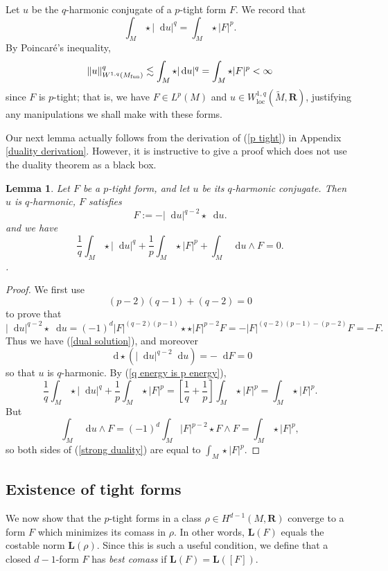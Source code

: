 \documentclass[reqno,11pt]{amsart}
\newcommand{\RR}{\mathbf{R}}
\newcommand*\dif{\mathop{}\!\mathrm{d}}
\newcommand{\Comass}{\mathbf L}
\newcommand{\dfn}[1]{\emph{#1}\index{#1}}
\newcommand{\loc}{\mathrm{loc}}
\newtheorem{lemma}[theorem]{Lemma}
\theoremstyle{definition}
\numberwithin{equation}{section}
\begin{document}
Let $u$ be the $q$-harmonic conjugate of a $p$-tight form $F$.
We record that 
\begin{equation}\label{q energy is p energy}
\int_M \star |\dif u|^q = \int_M \star |F|^p.
\end{equation}
By Poincar\'e's inequality,
$$\|u\|_{W^{1, q}(M_{\rm fun})}^q \lesssim \int_M \star |\dif u|^q = \int_M \star |F|^p < \infty$$
since $F$ is $p$-tight; that is, we have $F \in L^p(M)$ and $u \in W^{1, q}_\loc(\tilde M, \RR)$, justifying any manipulations we shall make with these forms.

Our next lemma actually follows from the derivation of (\ref{p tight}) in Appendix \ref{duality derivation}.
However, it is instructive to give a proof which does not use the duality theorem as a black box.

\begin{lemma}
Let $F$ be a $p$-tight form, and let $u$ be its $q$-harmonic conjugate.
Then $u$ is $q$-harmonic, $F$ satisfies
\begin{equation}\label{dual solution}
F := -|\dif u|^{q - 2} \star \dif u.
\end{equation}
 and we have
\begin{equation}\label{strong duality}
\frac{1}{q} \int_M \star |\dif u|^q + \frac{1}{p} \int_M \star |F|^p + \int_M \dif u \wedge F = 0.
\end{equation}.
\end{lemma}
\begin{proof}
We first use
$$(p - 2)(q - 1) + (q - 2) = 0$$
to prove that
$$|\dif u|^{q - 2} \star \dif u = (-1)^d |F|^{(q - 2)(p - 1)} \star \star |F|^{p - 2} F = - |F|^{(q - 2)(p - 1) - (p - 2)} F = - F.$$
Thus we have (\ref{dual solution}), and moreover
$$\dif \star (|\dif u|^{q - 2} \dif u) = - \dif F = 0$$
so that $u$ is $q$-harmonic.
By (\ref{q energy is p energy}),
$$\frac{1}{q} \int_M \star |\dif u|^q + \frac{1}{p} \int_M \star |F|^p = \left[\frac{1}{q} + \frac{1}{p}\right] \int_M \star |F|^p = \int_M \star |F|^p.$$
But
$$\int_M \dif u \wedge F = (-1)^d \int_M |F|^{p - 2} \star F \wedge F = \int_M \star |F|^p,$$
so both sides of (\ref{strong duality}) are equal to $\int_M \star |F|^p$.
\end{proof}


\subsection{\texorpdfstring{Existence of tight forms}{Existence of tight forms}}
We now show that the $p$-tight forms in a class $\rho \in H^{d - 1}(M, \RR)$ converge to a form $F$ which minimizes its comass in $\rho$.
In other words, $\Comass(F)$ equals the costable norm $\Comass(\rho)$.
Since this is such a useful condition, we define that a closed $d - 1$-form $F$ has \dfn{best comass} if $\Comass(F) = \Comass([F])$.
\end{document}
